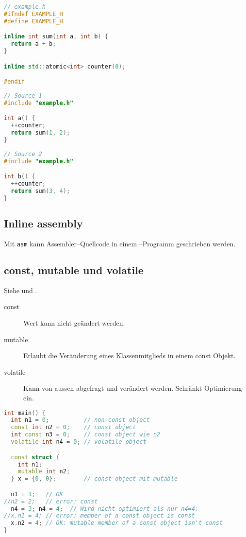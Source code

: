 \begin{lstlisting}[language=C++]
// example.h
#ifndef EXAMPLE_H
#define EXAMPLE_H

inline int sum(int a, int b) {
  return a + b;
}

inline std::atomic<int> counter(0);

#endif
\end{lstlisting}

\begin{lstlisting}[language=C++]
// Source 1
#include "example.h"

int a() {
  ++counter;
  return sum(1, 2);
}
\end{lstlisting}

\begin{lstlisting}[language=C++]
// Source 2
#include "example.h"

int b() {
  ++counter;
  return sum(3, 4);
}
\end{lstlisting}

\subsection{Inline assembly}

Mit \lstinline|asm| kann Assembler--Quellcode in einem \cpp{}--Programm
geschrieben werden.

\subsection{const, mutable und volatile}

Siehe  und .

\begin{description}
  \item[const] Wert kann nicht geändert werden.
  \item[mutable] Erlaubt die Veränderung eines Klassenmitglieds in einem const Objekt.
  \item[volatile] Kann von aussen abgefragt und verändert werden. Schränkt Optimierung ein.
\end{description}

\begin{lstlisting}[language=C++]
int main() {
  int n1 = 0;          // non-const object
  const int n2 = 0;    // const object
  int const n3 = 0;    // const object wie n2
  volatile int n4 = 0; // volatile object

  const struct {
    int n1;
    mutable int n2;
  } x = {0, 0};        // const object mit mutable

  n1 = 1;   // OK
//n2 = 2;   // error: const
  n4 = 3; n4 = 4;  // Wird nicht optimiert als nur n4=4;
//x.n1 = 4; // error: member of a const object is const
  x.n2 = 4; // OK: mutable member of a const object isn't const
}
\end{lstlisting}

